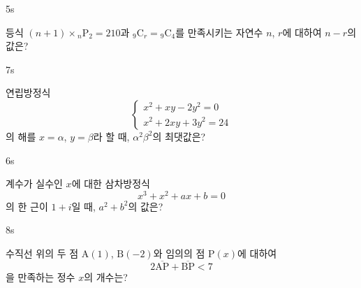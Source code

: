 \documentclass[10pt]{article}
\begin{document}
\begin{pagepair}
\noindent
\begin{minipage}[t][\probboxheight][t]{0.46\linewidth}
\begin{problem}{5}{s}
\par\smallskip
등식 $(n + 1) \times {}_n\mathrm{P}_2 = 210$과 ${}_9\mathrm{C}_r = {}_9\mathrm{C}_4$를 만족시키는 자연수 $n$, $r$에 대하여 $n - r$의 값은? 
\begin{choices}
\end{choices}
\end{problem}
\end{minipage}\hfill
\begin{minipage}[t][\probboxheight][t]{0.46\linewidth}
\begin{problem}{7}{s}
\par\smallskip
연립방정식
\[ \begin{cases} x^2 + xy - 2y^2 = 0 \\ x^2 + 2xy + 3y^2 = 24 \end{cases} \]
의 해를 $x = \alpha$, $y = \beta$라 할 때, $\alpha^2 \beta^2$의 최댓값은?
\begin{choices}
\end{choices}
\end{problem}
\end{minipage}
\par\vspace{4mm}
\noindent
\begin{minipage}[t][\probboxheight][t]{0.46\linewidth}
\begin{problem}{6}{s}
\par\smallskip
계수가 실수인 $x$에 대한 삼차방정식
\[ x^3 + x^2 + ax + b = 0 \]
의 한 근이 $1 + i$일 때, $a^2 + b^2$의 값은? 
\begin{choices}
\end{choices}
\end{problem}
\end{minipage}\hfill
\begin{minipage}[t][\probboxheight][t]{0.46\linewidth}
\begin{problem}{8}{s}
\par\smallskip
수직선 위의 두 점 $\mathrm{A}(1)$, $\mathrm{B}(-2)$와 임의의 점 $\mathrm{P}(x)$에 대하여
\[ 2\overline{\mathrm{AP}} + \overline{\mathrm{BP}} < 7 \]
을 만족하는 정수 $x$의 개수는?
\begin{choices}
\end{choices}
\end{problem}
\end{minipage}
\end{pagepair}
\end{document}

